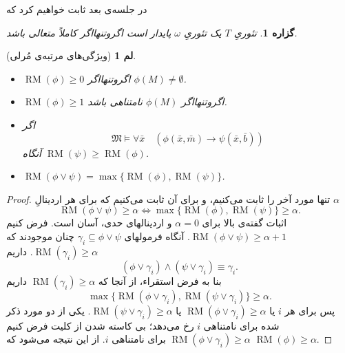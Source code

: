 \documentclass[12pt,a4paper]{report}
\theoremstyle{colorhead}
\newtheorem{prop}[thm]{گزاره}
\newtheorem{lem}[thm]{لم}
\DeclareMathOperator{\RM}{RM}
\begin{document}
در جلسه‌ی بعد ثابت خواهیم کرد که
\begin{prop}
تئوریِ
$T$
یک تئوریِ
$\omega$
پایدار است اگروتنهااگر کاملاً متعالی باشد.
\end{prop}
\begin{lem}[ویژگی‌های مرتبه‌ی مُرلی]
\hfill 
\begin{itemize}
\item 
$\RM(\phi)\geq 0$
اگروتنهااگر
$\phi(M)\not=\emptyset$.
\item 
$\RM(\phi)\geq 1$
اگروتنهااگر
$\phi(M)$
نامتناهی باشد.
\item 
اگر 
\[
\mathfrak{M}\models \forall \bar{x} \quad (\phi(\bar{x},\bar{m})\to
\psi(\bar{x},\bar{b}))
\]
آنگاه 
$\RM(\psi)\geq \RM(\phi)$.
\item 
$\RM(\phi\vee \psi)=\max\{\RM(\phi),\RM(\psi)\}$.
\end{itemize}
\end{lem}
\begin{proof}
تنها مورد آخر را ثابت می‌کنیم، و برای آن ثابت می‌کنیم که برای هر اردینالِ
$\alpha$
\[
\RM(\phi\vee \psi)\geq \alpha\Leftrightarrow \max\{\RM(\phi),\RM(\psi)\}\geq \alpha.
\]
اثبات گفته‌ی بالا برای
$\alpha=0$
و اردینالهای حدی، آسان است. فرض کنیم
$\RM(\phi\vee \psi)\geq \alpha+1$.
آنگاه فرمولهای
$\gamma_i\subseteq \phi\vee \psi$
چنان موجودند که 
$\RM(\gamma_i)\geq \alpha$.
داریم
\[
(\phi\vee \gamma_i)\wedge(\psi\vee \gamma_i)\equiv \gamma_i.
\]
بنا به فرض استقراء، از آنجا که
$\RM(\gamma_i)\geq \alpha$
داریم
\[
\max\{\RM(\phi\vee \gamma_i),\RM(\psi\vee \gamma_i)\}\geq \alpha.
\]
پس برای هر
$i$
یا
$\RM(\phi\vee \gamma_i)\geq \alpha$
یا
$\RM(\psi\vee \gamma_i)\geq \alpha$.
یکی از دو مورد ذکر شده 
 برای نامتناهی
$i$
رخ می‌دهد؛ بی کاسته شدن از کلیت فرض کنیم
$\RM(\phi\vee \gamma_i)\geq \alpha$
برای نامتناهی
$i$.
از این نتیجه می‌شود که
$\RM(\phi)\geq \alpha$.
\end{proof}
\pagebreak
\end{document}
